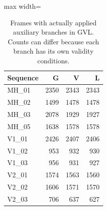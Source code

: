 \begin{table}[tb]
\caption{Frames with actually applied auxiliary branches in GVL. Counts can differ because each branch has its own validity conditions.}\label{tab:updates}
\centering\small
\begin{adjustbox}{max width=\columnwidth}
\begin{tabular}{lrrr}
\toprule
Sequence & G & V & L \\
\midrule
MH\_01 & 2350 & 2343 & 2343 \\
MH\_02 & 1499 & 1478 & 1478 \\
MH\_03 & 2078 & 1929 & 1927 \\
MH\_05 & 1638 & 1578 & 1578 \\
V1\_01 & 2426 & 2407 & 2406 \\
V1\_02 & 953 & 932 & 930 \\
V1\_03 & 956 & 931 & 927 \\
V2\_01 & 1574 & 1563 & 1560 \\
V2\_02 & 1606 & 1571 & 1570 \\
V2\_03 & 706 & 637 & 627 \\
\bottomrule
\end{tabular}
\end{adjustbox}
\end{table}
